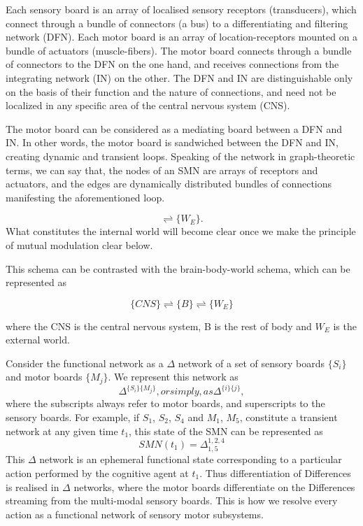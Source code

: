 Each sensory board is an array of localised sensory receptors (transducers), which connect through a bundle of connectors (a bus) to a differentiating and filtering network (DFN). Each motor board is an array of location-receptors mounted on a bundle of actuators (muscle-fibers). The motor board connects through a bundle of connectors to the DFN on the one hand, and receives connections from the integrating network (IN) on the other. The DFN and IN are distinguishable only on the basis of their function and the nature of connections, and need not be localized in any specific area of the central nervous system (CNS).

The motor board can be considered as a mediating board between a DFN and IN. In other words, the motor board is sandwiched between the DFN and IN, creating dynamic and transient loops. Speaking of the network in graph-theoretic terms, we can say that, the nodes of an SMN are arrays of receptors and actuators, and the edges are dynamically distributed bundles of connections manifesting the aforementioned loop.

\begin{equation}
[\{n(SMN)\}_i \rightleftharpoons \{n(SMN)\}_j] \rightleftharpoons \{W_E\}.
\end{equation}
What constitutes the internal world will become clear once we make the principle of mutual modulation clear below.


This schema can be contrasted with the brain-body-world schema, which can be represented as 

\begin{equation}
\{CNS\} \rightleftharpoons \{B\} \rightleftharpoons \{W_E\}
\end{equation}

where the CNS is the central nervous system, B is the rest of body and $W_E$ is the external world.

Consider the functional network as a $\Delta$ network of a set of sensory boards $\{S_i\}$ and motor boards $\{M_j\}$. We represent this network as \begin{equation}\label{delta_notation}\Delta^{\{S_i\}\{M_j\}}, or simply, as  \Delta^{\{i\}\{j\}},
\end{equation} where the subscripts always refer to motor boards, and superscripts to the sensory boards. For example, if $S_1$, $S_2$, $S_4$ and $M_1$, $M_5$, constitute a transient network at any given time $t_1$, this state of the SMN can be represented as 
\begin{equation}\label{delta_eg}SMN(t_1) = \Delta^{1,2,4}_{1,5}
\end{equation} This $\Delta$ network is an ephemeral functional state corresponding to a particular action performed by the cognitive agent at $t_1$. Thus differentiation of Differences is realised in $\Delta$ networks, where the motor boards differentiate on the Differences streaming from the multi-modal sensory boards. This is how we resolve every action as a functional network of sensory motor subsystems.

